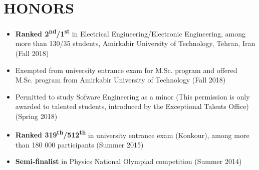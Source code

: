 \section{HONORS}
\begin{itemize}
	\item \textbf{Ranked 2\textsuperscript{nd}/1\textsuperscript{st}} in Electrical Engineering/Electronic Engineering, among more than 130/35 students, Amirkabir University of Technology, Tehran, Iran (Fall 2018)

	\item Exempted from university entrance exam for M.Sc. program and offered M.Sc. program from Amirkabir University of Technology (Fall 2018)

	\item Permitted to study Sofware Engineering as a minor (This permission is only awarded to talented students, introduced by
the Exceptional Talents Office) (Spring 2018)

	\item \textbf{Ranked 319\textsuperscript{th}/512\textsuperscript{th}} in university entrance exam (Konkour), among more than 180 000 participants (Summer 2015)

	\item \textbf{Semi-finalist} in Physics National Olympiad competition (Summer 2014)
\end{itemize}

